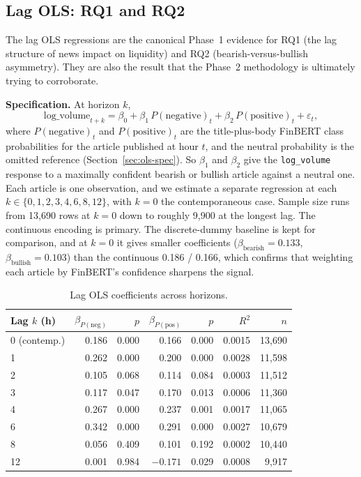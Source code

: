 \subsection{Lag OLS: RQ1 and RQ2}\label{sec:lag-ols}

The lag OLS regressions are the canonical Phase~1 evidence for RQ1 (the lag structure of news impact on liquidity) and RQ2 (bearish-versus-bullish asymmetry). They are also the result that the Phase~2 methodology is ultimately trying to corroborate.

\textbf{Specification.} At horizon $k$,
\begin{equation}
  \text{log\_volume}_{t+k} = \beta_0 + \beta_1\, P(\text{negative})_t + \beta_2\, P(\text{positive})_t + \varepsilon_t ,
\end{equation}
where $P(\text{negative})_t$ and $P(\text{positive})_t$ are the title-plus-body FinBERT class probabilities for the article published at hour $t$, and the neutral probability is the omitted reference (Section~\ref{sec:ols-spec}). So $\beta_1$ and $\beta_2$ give the \texttt{log\_volume} response to a maximally confident bearish or bullish article against a neutral one. Each article is one observation, and we estimate a separate regression at each $k \in \{0, 1, 2, 3, 4, 6, 8, 12\}$, with $k = 0$ the contemporaneous case. Sample size runs from 13{,}690 rows at $k = 0$ down to roughly 9{,}900 at the longest lag. The continuous encoding is primary. The discrete-dummy baseline is kept for comparison, and at $k = 0$ it gives smaller coefficients ($\beta_{\text{bearish}} = 0.133$, $\beta_{\text{bullish}} = 0.103$) than the continuous 0.186 / 0.166, which confirms that weighting each article by FinBERT's confidence sharpens the signal.

\begin{table}[h]
  \centering
  \caption{Lag OLS coefficients across horizons.}
  \label{tab:lag-ols}
  \begin{tabular}{@{}lrrrrrr@{}}
    \toprule
    Lag $k$ (h) & $\beta_{P(\text{neg})}$ & $p$ & $\beta_{P(\text{pos})}$ & $p$ & $R^2$ & $n$ \\
    \midrule
    0 (contemp.) & 0.186 & 0.000 & 0.166 & 0.000 & 0.0015 & 13{,}690 \\
    1 & 0.262 & 0.000 & 0.200 & 0.000 & 0.0028 & 11{,}598 \\
    2 & 0.105 & 0.068 & 0.114 & 0.084 & 0.0003 & 11{,}512 \\
    3 & 0.117 & 0.047 & 0.170 & 0.013 & 0.0006 & 11{,}360 \\
    4 & 0.267 & 0.000 & 0.237 & 0.001 & 0.0017 & 11{,}065 \\
    6 & 0.342 & 0.000 & 0.291 & 0.000 & 0.0027 & 10{,}679 \\
    8 & 0.056 & 0.409 & 0.101 & 0.192 & 0.0002 & 10{,}440 \\
    12 & 0.001 & 0.984 & $-0.171$ & 0.029 & 0.0008 & 9{,}917 \\
    \bottomrule
  \end{tabular}
\end{table}


